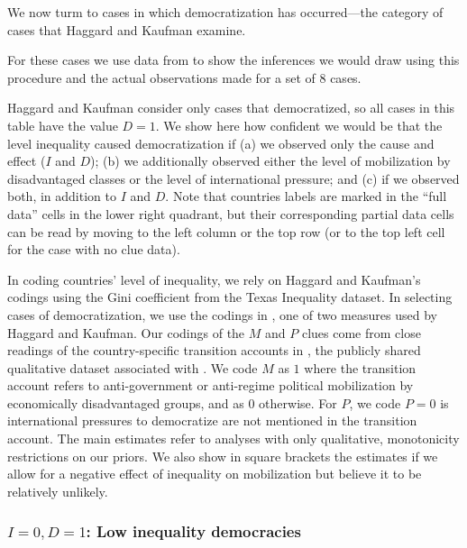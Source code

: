 \documentclass[12pt,]{book}
\begin{document}
We now turm to cases in which democratization has occurred---the category of cases that Haggard and Kaufman examine.

For these cases we use data from \citet{haggard2012inequality} to show the inferences we would draw using this procedure and the actual observations made for a set of 8 cases.

Haggard and Kaufman consider only cases that democratized, so all cases in this table have the value \(D=1\). We show here how confident we would be that the level inequality caused democratization if (a) we observed only the cause and effect (\(I\) and \(D\)); (b) we additionally observed either the level of mobilization by disadvantaged classes or the level of international pressure; and (c) if we observed both, in addition to \(I\) and \(D\). Note that countries labels are marked in the ``full data'' cells in the lower right quadrant, but their corresponding partial data cells can be read by moving to the left column or the top row (or to the top left cell for the case with no clue data).

In coding countries' level of inequality, we rely on Haggard and Kaufman's codings using the Gini coefficient from the Texas Inequality dataset. In selecting cases of democratization, we use the codings in \citet{cheibub2010democracy}, one of two measures used by Haggard and Kaufman. Our codings of the \(M\) and \(P\) clues come from close readings of the country-specific transition accounts in \citet{haggard2012distributive}, the publicly shared qualitative dataset associated with \citet{haggard2012inequality}. We code \(M\) as \(1\) where the transition account refers to anti-government or anti-regime political mobilization by economically disadvantaged groups, and as \(0\) otherwise. For \(P\), we code \(P=0\) is international pressures to democratize are not mentioned in the transition account. The main estimates refer to analyses with only qualitative, monotonicity restrictions on our priors. We also show in square brackets the estimates if we allow for a negative effect of inequality on mobilization but believe it to be relatively unlikely.

\hypertarget{i0-d1-low-inequality-democracies}{%
\subsubsection{\texorpdfstring{\(I=0, D=1\): Low inequality democracies}{I=0, D=1: Low inequality democracies}}\label{i0-d1-low-inequality-democracies}}
\end{document}
